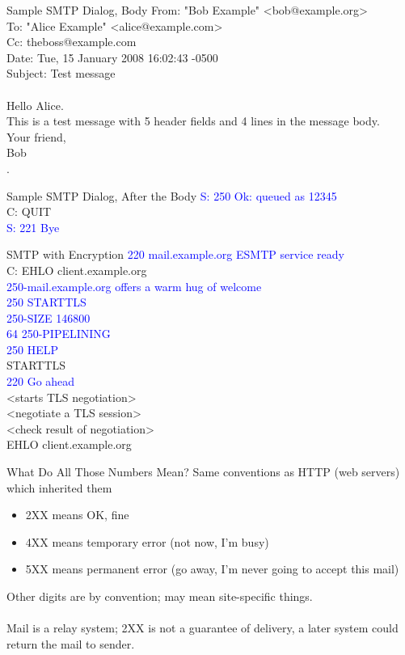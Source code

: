 \documentclass[nobackground,dvipsnames,table]{beamer}
\begin{document}
\begin{frame}{Sample SMTP Dialog, Body}
    From: "Bob Example" <bob@example.org>\\
    To: "Alice Example" <alice@example.com>\\
    Cc: theboss@example.com\\
    Date: Tue, 15 January 2008 16:02:43 -0500\\
    Subject: Test message\\~\\
    
    Hello Alice.\\
    This is a test message with 5 header fields and 4 lines in the message body.\\
    Your friend,\\
    Bob\\
    .
\end{frame}

\begin{frame}{Sample SMTP Dialog, After the Body}
    \textcolor{blue}{S: 250 Ok: queued as 12345}\\
    C: QUIT\\
    \textcolor{blue}{S: 221 Bye}
\end{frame}

\begin{frame}{SMTP with Encryption}
    \textcolor{blue}{220 mail.example.org ESMTP service ready}\\
       C: EHLO client.example.org\\
    \textcolor{blue}{250-mail.example.org offers a warm hug of welcome\\
    250 STARTTLS\\
    250-SIZE 146800\\64
    250-PIPELINING\\
    250 HELP}\\
    STARTTLS\\
    \textcolor{blue}{220 Go ahead}\\
    <starts TLS negotiation>\\
    <negotiate a TLS session>\\
    <check result of negotiation>\\
    EHLO client.example.org
\end{frame}

\begin{frame}{What Do All Those Numbers Mean?}
    Same conventions as HTTP (web servers) which inherited them
    \begin{itemize}
        \item 2XX means OK, fine
        \item 4XX means temporary error (not now, I’m busy)
        \item 5XX means permanent error (go away, I’m never going to accept this mail)
    \end{itemize}
    Other digits are by convention; may mean site-specific things.\\~\\
    Mail is a relay system; 2XX is not a guarantee of delivery, a later system could return the mail to sender.
\end{frame}
\end{document}
